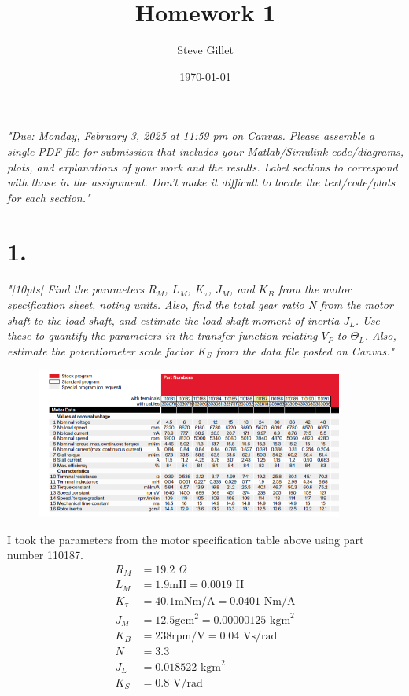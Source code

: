 \documentclass{article}
\title{Homework 1}
\author{Steve Gillet}
\date{\today}
\begin{document}
\maketitle
\textit{
    "Due: Monday, February 3, 2025 at 11:59 pm on Canvas. Please assemble a single PDF file for
    submission that includes your Matlab/Simulink code/diagrams, plots, and explanations of your
    work and the results. Label sections to correspond with those in the assignment. Don’t make it
    difficult to locate the text/code/plots for each section."
}

\section*{1.}

\textit{
    "[10pts] Find the parameters $R_M$, $L_M$, $K_\tau$, $J_M$, and $K_B$ from the motor specification sheet, noting
    units. Also, find the total gear ratio N from the motor shaft to the load shaft, and estimate the
    load shaft moment of inertia $J_L$. Use these to quantify the parameters in the transfer function
    relating $V_P$ to $\Theta_L$. Also, estimate the potentiometer scale factor $K_S$ from the data file posted on Canvas."
}

\begin{figure}[H]
    \centering
    \includegraphics[width=0.9\textwidth]{motorSpec.png}
\end{figure}

I took the parameters from the motor specification table above using part number 110187.
\begin{align*}
    R_M&=19.2\;\Omega \\
    L_M&=1.9\text{mH}=0.0019\text{ H} \\
    K_\tau&=40.1\text{mNm/A}=0.0401\text{ Nm/A}  \\
    J_M&=12.5\text{gcm}^2=0.00000125\text{ kgm}^2 \\
    K_B&=238\text{rpm/V}=0.04\text{ Vs/rad} \\
    N&=3.3 \\
    J_L&=0.018522\text{ kgm}^2 \\
    K_S&=0.8\text{ V/rad}
\end{align*}
\end{document}
